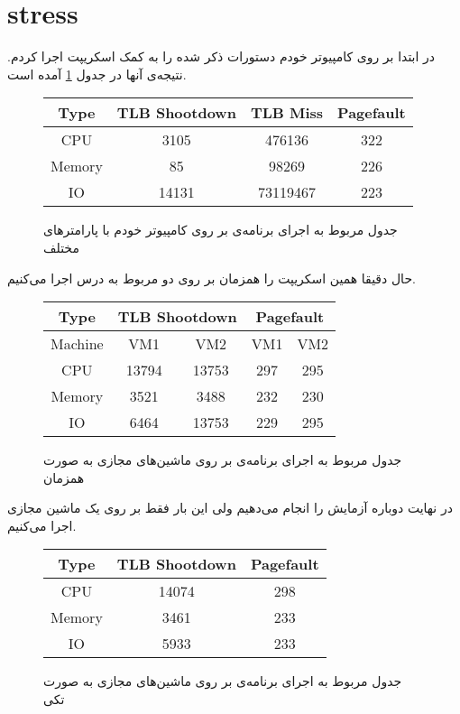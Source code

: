 \section{stress}
در ابتدا بر روی کامپیوتر خودم دستورات ذکر شده را به کمک اسکریپت
اجرا کردم. نتیجه‌ی آنها در جدول
\ref{table:bare_metal_stress}
آمده است.
\begin{figure}[H]
    \begin{latin}
        \centering
        \begin{tabular}{|c|ccc|}
        \hline
        Type & TLB Shootdown & TLB Miss & Pagefault\\
        \hline
        CPU & 3105 & 476136 & 322\\
        \hline
        Memory & 85 & 98269 & 226\\
        \hline
        IO & 14131 & 73119467 & 223\\
        \hline
        \end{tabular}
    \end{latin}
    \caption{جدول مربوط به اجرای برنامه‌ی  بر روی کامپیوتر خودم با پارامتر‌های مختلف}
    \label{table:bare_metal_stress}
\end{figure}
حال دقیقا همین اسکریپت را همزمان بر روی دو
مربوط به درس اجرا می‌کنیم.
\begin{figure}[H]
    \begin{latin}
        \centering
        \begin{tabular}{|c|cccc|}
        \hline
        Type & \multicolumn{2}{c}{TLB Shootdown} & \multicolumn{2}{c|}{Pagefault}\\
        \hline
        Machine & VM1 & VM2 & VM1 & VM2\\
        \hline
        CPU & 13794 & 13753 & 297 & 295\\
        \hline
        Memory & 3521 & 3488 & 232 & 230\\
        \hline
        IO & 6464 & 13753 & 229 & 295\\
        \hline
        \end{tabular}
    \end{latin}
    \caption{جدول مربوط به اجرای برنامه‌ی  بر روی ماشین‌های مجازی به صورت همزمان}
    \label{table:vm_stress}
\end{figure}
در نهایت دوباره آزمایش را انجام می‌دهیم ولی این بار فقط بر روی یک ماشین مجازی اجرا می‌کنیم.
\begin{figure}[H]
    \begin{latin}
        \centering
        \begin{tabular}{|c|cc|}
        \hline
        Type & TLB Shootdown & Pagefault\\
        \hline
        CPU & 14074 & 298\\
        \hline
        Memory & 3461 & 233\\
        \hline
        IO & 5933 & 233\\
        \hline
        \end{tabular}
    \end{latin}
    \caption{جدول مربوط به اجرای برنامه‌ی  بر روی ماشین‌های مجازی به صورت تکی}
    \label{table:vm_stress_single}
\end{figure}
